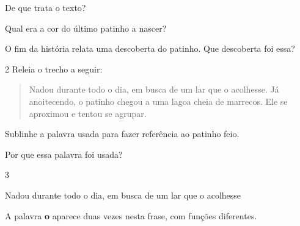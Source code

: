 \begin{conteudo}
\begin{conteudo}
\begin{conteudo}
\begin{conteudo}
\begin{quote}
\end{quote}

\pagebreak
\begin{escolha}
\item De que trata o texto?
\item{}

\item Qual era a cor do último patinho a nascer?
\item{}

\item O fim da história relata uma descoberta do patinho. Que descoberta
foi essa?
\item{}
\end{escolha}

\num{2} Releia o trecho a seguir:

\begin{quote}
Nadou durante todo o dia, em busca de um lar que o acolhesse. Já
anoitecendo, o patinho chegou a uma lagoa cheia de marrecos. Ele
se aproximou e tentou se agrupar.
\end{quote}

\begin{escolha}
\item Sublinhe a palavra usada para fazer referência ao patinho feio.


\item Por que essa palavra foi usada?
\item{}
\end{escolha}

\num{3}

\begin{mdframed}[linewidth=10pt,linecolor=salmao!20,backgroundcolor=salmao!20,roundcorner=20pt]
Nadou durante todo o dia, em busca de um lar que o acolhesse
\end{mdframed}

A palavra \textbf{o} aparece duas vezes nesta frase, com funções diferentes.


\end{conteudo}
\end{conteudo}
\end{conteudo}
\end{conteudo}
